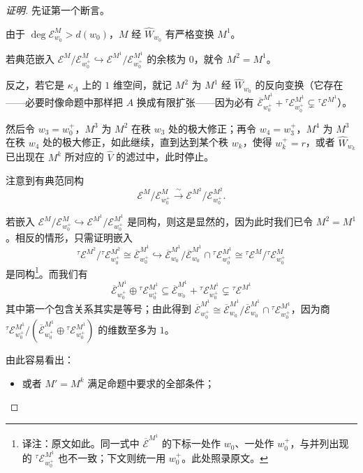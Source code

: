 \begin{proof}[证明]
先证第一个断言。

由于 $\deg \mathcal{E}^M_{w_0} > d(w_0)$，$M$ 经 $\widehat{W}_{w_0}$ 有严格变换 $M^1$。

若典范嵌入 $\mathcal{E}^M/\mathcal{E}^M_{w_0^+} \hookrightarrow \mathcal{E}^{M^1}/\mathcal{E}^{M^1}_{w_0^+}$ 的余核为 $0$，就令 $M^2 = M^1$。

反之，若它是 $\kappa_A$ 上的 $1$ 维空间，就记 $M^2$ 为 $M^1$ 经 $\widehat{W}_{w_0}$ 的反向变换（它存在——必要时像命题中那样把 $A$ 换成有限扩张——因为必有 $\overline{\mathcal{E}}^{M^1}_{w_0^+} + {}^\tau\mathcal{E}^{M^1}_{w_0^+} \subsetneq {}^\tau\mathcal{E}^{M^1}$）。

然后令 $w_3 = w_0^+$，$M^3$ 为 $M^2$ 在秩 $w_3$ 处的极大修正；再令 $w_4 = w_3^+$，$M^4$ 为 $M^3$ 在秩 $w_4$ 处的极大修正，如此继续，直到达到某个秩 $w_k$，使得 $w_k^+ = r$，或者 $\widehat{W}_{w_k}$ 已出现在 $M^k$ 所对应的 $\widehat{V}$ 的滤过中，此时停止。

注意到有典范同构
\[
\mathcal{E}^M/\mathcal{E}^M_{w_0^+} \xrightarrow{\ \sim\ } \mathcal{E}^{M^2}/\mathcal{E}^{M^2}_{w_0^+}.
\]

若嵌入 $\mathcal{E}^M/\mathcal{E}^M_{w_0^+} \hookrightarrow \mathcal{E}^{M^1}/\mathcal{E}^{M^1}_{w_0^+}$ 是同构，则这是显然的，因为此时我们已令 $M^2 = M^1$。相反的情形，只需证明嵌入
\[
{}^\tau\mathcal{E}^{M^2}/{}^\tau\mathcal{E}^{M^2}_{w_0^+} \cong \overline{\mathcal{E}}^{M^1}_{w_0^+}
\hookrightarrow \overline{\mathcal{E}}^{M^1}_{w_0}/\overline{\mathcal{E}}^{M^1}_{w_0} \cap {}^\tau\mathcal{E}^{M^1}_{w_0^+}
\cong {}^\tau\mathcal{E}^M/{}^\tau\mathcal{E}^M_{w_0^+}
\]
是同构\footnote{译注：原文如此。同一式中 $\overline{\mathcal{E}}^{M^1}$ 的下标一处作 $w_0$、一处作 $w_0^+$，与并列出现的 ${}^\tau\mathcal{E}^{M^1}_{w_0^+}$ 也不一致；下文则统一用 $w_0^+$。此处照录原文。}。而我们有
\[
\overline{\mathcal{E}}^{M^1}_{w_0^+} \oplus {}^\tau\mathcal{E}^{M^1}_{w_0^+}
\subseteq \overline{\mathcal{E}}^{M^1}_{w_0} + {}^\tau\mathcal{E}^{M^1}_{w_0^+}
\subsetneq {}^\tau\mathcal{E}^{M^1}
\]
其中第一个包含关系其实是等号；由此得到 $\overline{\mathcal{E}}^{M^1}_{w_0^+} \cong \overline{\mathcal{E}}^{M^1}_{w_0}/\overline{\mathcal{E}}^{M^1}_{w_0} \cap {}^\tau\mathcal{E}^{M^1}_{w_0^+}$，因为商 ${}^\tau\mathcal{E}^{M^1}_{w_0^+}/(\overline{\mathcal{E}}^{M^1}_{w_0^+} \oplus {}^\tau\mathcal{E}^{M^1}_{w_0^+})$ 的维数至多为 $1$。

由此容易看出：

\begin{itemize}
\item 或者 $M' = M^k$ 满足命题中要求的全部条件；


\end{itemize}
\end{proof}
